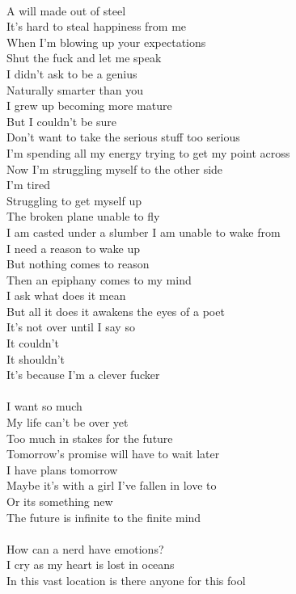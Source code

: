 \documentclass[12pt, b5paper, oneside]{book}
\begin{document}
\\A will made out of steel
\\It's hard to steal happiness from me
\\When I'm blowing up your expectations
\\Shut the fuck and let me speak
\\I didn't ask to be a genius
\\Naturally smarter than you
\\I grew up becoming more mature
\\But I couldn't be sure
\\Don't want to take the serious stuff too serious
\\I'm spending all my energy trying to get my point across
\\Now I'm struggling myself to the other side
\\I'm tired
\\Struggling to get myself up
\\The broken plane unable to fly
\\I am casted under a slumber I am unable to wake from
\\I need a reason to wake up
\\But nothing comes to reason
\\Then an epiphany comes to my mind
\\I ask what does it mean
\\But all it does it awakens the eyes of a poet
\\It's not over until I say so
\\It couldn't
\\It shouldn't
\\It's because I'm a clever fucker
%
\\\\I want so much
\\My life can't be over yet
\\Too much in stakes for the future
\\Tomorrow's promise will have to wait later
\\I have plans tomorrow
\\Maybe it's with a girl I've fallen in love to
\\Or its something new
\\The future is infinite to the finite mind
%
\\\\How can a nerd have emotions?
\\I cry as my heart is lost in oceans
\\In this vast location is there anyone for this fool
\end{document}
